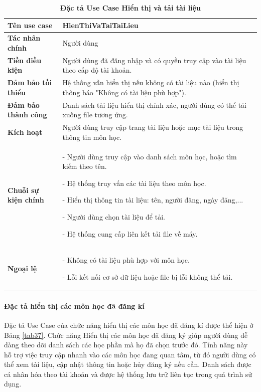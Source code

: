 \documentclass{article}
\begin{document}
	\begin{table}[H]
		\centering
		\caption [Đặc tả Use Case Hiển thị và tải tài liệu]{\bfseries \fontsize{12pt}{0pt}\selectfont Đặc tả Use Case Hiển thị và tải tài liệu}
		\label{tab36}
		\begin{tabular}{|p{4cm}|p{10.5cm}|}
			\hline
			\textbf{Tên use case} & HienThiVaTaiTaiLieu \\
			\hline
			\textbf{Tác nhân chính} & Người dùng \\
			\hline
			\textbf{Tiền điều kiện} & Người dùng đã đăng nhập và có quyền truy cập vào tài liệu theo cấp độ tài khoản. \\
			\hline
			\textbf{Đảm bảo tối thiểu} & Hệ thống vẫn hiển thị nếu không có tài liệu nào (hiển thị thông báo "Không có tài liệu phù hợp"). \\
			\hline
			\textbf{Đảm bảo thành công} & Danh sách tài liệu hiển thị chính xác, người dùng có thể tải xuống file tương ứng. \\
			\hline
			\textbf{Kích hoạt} & Người dùng truy cập trang tài liệu hoặc mục tài liệu trong thông tin môn học. \\
			\hline
			\textbf{Chuỗi sự kiện chính} &
			- Người dùng truy cập vào danh sách môn học, hoặc tìm kiếm theo tên.
			
			- Hệ thống truy vấn các tài liệu theo môn học.
			
			- Hiển thị thông tin tài liệu: tên, người đăng, ngày đăng,...
			
			- Người dùng chọn tài liệu để tải.
			
			- Hệ thống cung cấp liên kết tải file về máy.
			\\
			\hline
			\textbf{Ngoại lệ} &
			- Không có tài liệu phù hợp với môn học.
			
			- Lỗi kết nối cơ sở dữ liệu hoặc file bị lỗi không thể tải.
			\\
			\hline
		\end{tabular}
	\end{table}
	
	\paragraph{Đặc tả hiển thị các môn học đã đăng kí} \mbox{}
	
	Đặc tả Use Case của chức năng hiển thị các môn học đã đăng kí được thể hiện ở Bảng \ref{tab37}. Chức năng Hiển thị các môn học đã đăng ký giúp người dùng dễ dàng theo dõi danh sách các học phần mà họ đã chọn trước đó. Tính năng này hỗ trợ việc truy cập nhanh vào các môn học đang quan tâm, từ đó người dùng có thể xem tài liệu, cập nhật thông tin hoặc hủy đăng ký nếu cần. Danh sách được cá nhân hóa theo tài khoản và được hệ thống lưu trữ liên tục trong quá trình sử dụng.
	
\end{document}
